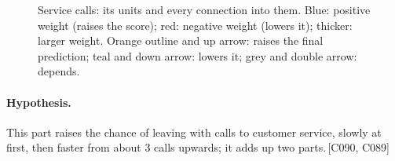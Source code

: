 \documentclass[a4paper,10pt]{article}
\newif\ifreviewmarks
\newcommand{\reviewrule}{\noindent{\color{BrickRed}\rule{\linewidth}{0.8pt}}}
\newenvironment{drafted}[1][]{%
  \ifreviewmarks\par\addvspace{\medskipamount}\reviewrule\par\nopagebreak
  \noindent{\color{BrickRed}\sffamily\footnotesize\textbf{Thesis Draft}\quad #1\hfill review}\par\nopagebreak\smallskip\fi}{%
  \ifreviewmarks\par\smallskip\noindent{\color{BrickRed}\sffamily\footnotesize end of thesis draft}\par\nopagebreak\reviewrule\par\medskip\fi}
\begin{document}
\begin{drafted}[plain-language layer: churn100-s4-c3]
\begin{figure}[H]
{}%
\caption{Service calls: its units and every connection into them. Blue: positive weight (raises the score); red: negative weight (lowers it); thicker: larger weight. Orange outline and up arrow: raises the final prediction; teal and down arrow: lowers it; grey and double arrow: depends.}
\label{fig:churn100s4c3:units-ann87}
\end{figure}
\paragraph{Hypothesis.} This part raises the chance of leaving with calls to customer service, slowly at first, then faster from about 3 calls upwards; it adds up two parts.\,{\scriptsize\textcolor{NavyBlue}{[C090, C089]}}

\end{drafted}
\end{document}
